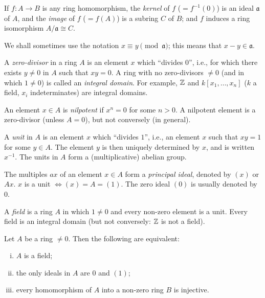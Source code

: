 If $f \colon A \to B$ is any ring homomorphism, the \emph{kernel} of $f$ ($= f^{-1}(0)$) is an ideal $\mathfrak{a}$ of $A$, and the \emph{image} of $f$ ($= f(A)$) is a subring $C$ of $B$; and $f$ induces a ring isomorphism $A/\mathfrak{a} \cong C$.

We shall sometimes use the notation $x \equiv y \pmod{\mathfrak{a}}$; this means that $x - y \in \mathfrak{a}$.



A \emph{zero-divisor} in a ring $A$ is an element $x$ which ``divides $0$'', i.e., for which there exists $y \neq 0$ in $A$ such that $xy = 0$. A ring with no zero-divisors $\neq 0$ (and in which $1 \neq 0$) is called an \emph{integral domain}. For example, $\mathbb{Z}$ and $k[x_1, \ldots, x_n]$ ($k$ a field, $x_i$ indeterminates) are integral domains.

An element $x \in A$ is \emph{nilpotent} if $x^n = 0$ for some $n > 0$. A nilpotent element is a zero-divisor (unless $A = 0$), but not conversely (in general).

A \emph{unit} in $A$ is an element $x$ which ``divides $1$'', i.e., an element $x$ such that $xy = 1$ for some $y \in A$. The element $y$ is then uniquely determined by $x$, and is written $x^{-1}$. The units in $A$ form a (multiplicative) abelian group.

The multiples $ax$ of an element $x \in A$ form a \emph{principal ideal}, denoted by $(x)$ or $Ax$. $x$ is a unit $\iff (x) = A = (1)$. The zero ideal $(0)$ is usually denoted by $0$.

A \emph{field} is a ring $A$ in which $1 \neq 0$ and every non-zero element is a unit. Every field is an integral domain (but not conversely: $\mathbb{Z}$ is not a field).

\begin{proposition}\label{prop:field-characterization}
Let $A$ be a ring $\neq 0$. Then the following are equivalent:
\begin{enumerate}[i)]
    \item $A$ is a field;
    \item the only ideals in $A$ are $0$ and $(1)$;
    \item every homomorphism of $A$ into a non-zero ring $B$ is injective.
\end{enumerate}
\end{proposition}

